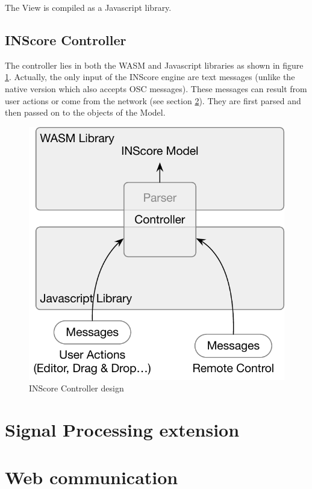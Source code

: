 \documentclass{article}
\begin{document}
The View is compiled as a Javascript library.

\subsection{INScore Controller}

The controller lies in both the WASM and Javascript libraries as shown in figure \ref{fig:ctrl}. Actually, the only input of the INScore engine are text messages (unlike the native version which also accepts OSC messages). These messages can result from user actions or come from the network (see section \ref{sec:comm}). They are first parsed and then passed on to the objects of the Model.
\begin{figure}[H]
\centering
\includegraphics[width=0.7\columnwidth]{rsrc/controller.pdf}
\caption{INScore Controller design}
\label{fig:ctrl}
\end{figure}


\section{Signal Processing extension}\label{sec:faust}



\section{Web communication}\label{sec:comm}

\end{document}
